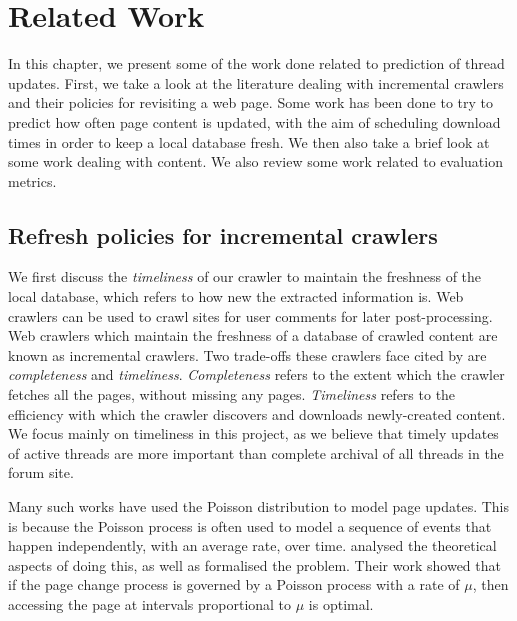 \chapter{Related Work}
In this chapter, we present some of the work done related to prediction of 
thread updates. First, we take a look at the literature dealing with incremental 
crawlers and their policies for revisiting a web page. Some work has been done 
to try to predict how often page content is updated, with the aim of scheduling 
download times in order to keep a local database fresh. We then also take a 
brief look at some work dealing with content. We also review some work related 
to evaluation metrics.

 


\section{Refresh policies for incremental crawlers}

We first discuss the \emph{timeliness} of our crawler to maintain the freshness 
of the local database, which refers to how new the extracted information is. Web 
crawlers can be used to crawl sites for user comments for 
later post-processing. Web crawlers which maintain the freshness of a database of 
crawled content are known as incremental crawlers. Two trade-offs these crawlers 
face cited by  are \emph{completeness} and \emph{timeliness}.  
\emph{Completeness} refers to the extent which the crawler fetches all the 
pages, without missing any pages. \emph{Timeliness} refers to the efficiency 
with which the crawler discovers and downloads newly-created content. We focus 
mainly on timeliness in this project, as we believe that timely updates of 
active threads are more important than complete archival of all threads in the 
forum site.

Many such works have used the Poisson distribution to model page updates.  This 
is because the Poisson process is often used to model a sequence of events that 
happen independently, with an average rate, over time.   
analysed the theoretical aspects of doing this, as well as formalised the 
problem. Their work showed that if the page change process is governed by a 
Poisson process with a rate of $\mu$, then accessing the page at intervals 
proportional to $\mu$ is optimal.

